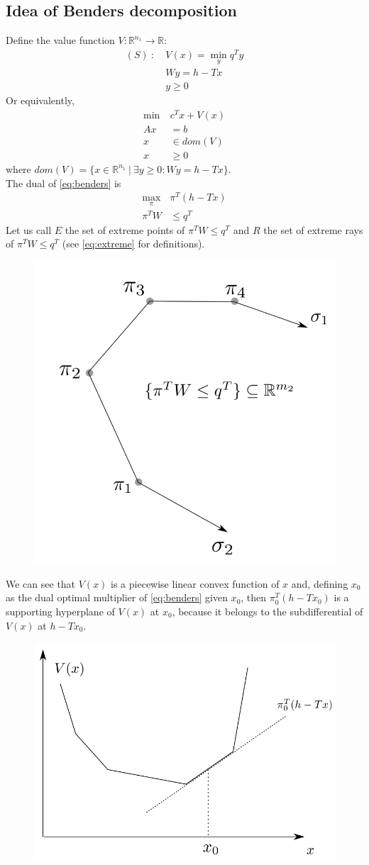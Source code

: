 \documentclass[12pt, openany]{report}
\newcommand{\R}{\mathbb{R}}
\theoremstyle{definition}
\begin{document}
\subsection{Idea of Benders decomposition}
Define the value function $V:\R^{n_1}\to \R$:
\begin{equation}\label{eq:benders}
	\begin{aligned}
		(S)\ :\ &V(x) = \min_yq^Ty\\
		&Wy=h-Tx\\
		&y\geq0
	\end{aligned}
\end{equation}
Or equivalently,
\begin{equation}
	\begin{aligned}
		\min \ &c^Tx+V(x)\\
		Ax&=b\\
		x&\in dom(V)\\
		x&\ge 0
	\end{aligned}
\end{equation}
where $dom(V) = \{x\in \R^{n_1}\ |\ \exists y\geq0:Wy=h-Tx\}$.\\
The dual of \eqref{eq:benders} is 
\begin{equation}
	\begin{aligned}
		\max_{\pi}& \pi^T(h-Tx)\\
		\pi^TW&\le q^T
	\end{aligned}
\end{equation}
Let us call $E$ the set of extreme points of $\pi^TW\le q^T$ and $R$ the set of extreme rays of $\pi^TW\le q^T$ (see \eqref{eq:extreme} for definitions). 
\begin{figure}[H]
	\centering
	\includegraphics[width=.35\textwidth]{img/extreme.png}
\end{figure}
We can see that $V(x)$ is a piecewise linear convex function of $x$ and, defining $x_0$ as the dual optimal multiplier of \eqref{eq:benders} given $x_0$, then $\pi_0^T(h-Tx_0)$ is a supporting hyperplane of $V(x)$ at $x_0$, because it belongs to the subdifferential of $V(x)$ at $h-Tx_0$.
\begin{figure}[H]
	\centering
	\includegraphics[width=.5\textwidth]{img/supporting_hyperplane.png}
\end{figure}
\end{document}
